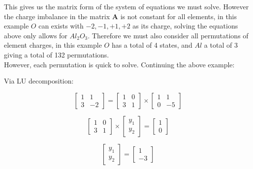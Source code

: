 \vspace*{0.5em}
This gives us the matrix form of the system of equations we must solve. However the charge imbalance in the matrix $\mathbf{A}$ is not constant for all elements, in this example $O$ can exists with $-2, -1, +1, +2$ as its charge, solving the equations above only allows for $Al_2O_3$. Therefore we must also consider all permutations of element charges, in this example $O$ has a total of 4 states, and $Al$ a total of 3 giving a total of 132 permutations. \\

However, each permutation is quick to solve. Continuing the above example:

\vspace{1.5em}

\begin{minipage}{0.4\textwidth}
	\label{LU_Decomp}
	\begin{center}
		Via LU decomposition:
	\end{center}
	\begin{equation*}
	\begin{bmatrix}
	1 & 1 \\
	3 & -2
	\end{bmatrix}
	=
	\begin{bmatrix}
	1 & 0 \\
	3 & 1
	\end{bmatrix}
	\times
	\begin{bmatrix}
	1 & 1\\
	0 & -5
	\end{bmatrix}
	\end{equation*}
	
	\begin{equation*}
	\begin{bmatrix}
	1 & 0 \\
	3 & 1
	\end{bmatrix}
	\times
	\begin{bmatrix}
	y_1 \\
	y_2
	\end{bmatrix}
	=
	\begin{bmatrix}
	1 \\
	0
	\end{bmatrix}
	\end{equation*}
	
	\begin{equation*}
	\begin{bmatrix}
	y_1 \\
	y_2
	\end{bmatrix}
	=
	\begin{bmatrix}
	1 \\
	-3
	\end{bmatrix}
	\end{equation*}
	

\end{minipage}
